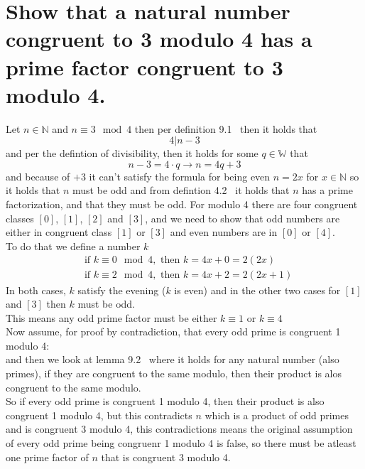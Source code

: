 \documentclass[12pt]{article}
\begin{document}
\section{Show that a natural number congruent to 3 modulo 4 has a prime factor congruent to 3 modulo 4.}
Let $n \in \mathbb{N}$ and $n \equiv 3 \mod 4$ then per definition 9.1~\cite{Algebra} then it holds that
\[
4 | n-3
\]
and per the defintion of divisibility, then it holds for some $q \in \mathbb{W}$ that
\[
n-3 = 4 \cdot q \rightarrow n = 4q + 3
\]
and because of $+3$ it can't satisfy the formula for being even $n = 2x$ for $x \in \mathbb{N}$ so it holds that $n$ must be odd
\newline
and from defintion 4.2~\cite{Algebra} it holds that $n$ has a prime factorization, and that they must be odd. 
\newline
\newline
For modulo 4 there are four congruent classes $[0]$, $[1]$, $[2]$ and $[3]$, and we need to show that odd numbers are either in congruent class $[1]$ or $[3]$ and even numbers are in $[0]$ or $[4]$.\\
To do that we define a number $k$
\begin{align*}
    &\text{if } k \equiv 0 \mod 4, \text{ then }k = 4x + 0 = 2(2x)\\
    &\text{if } k \equiv 2 \mod 4, \text{ then }k = 4x + 2 = 2(2x+1)
\end{align*}
In both cases, $k$ satisfy the evening ($k$ is even) and in the other two cases for $[1]$ and $[3]$ then $k$ must be odd.\\
This means any odd prime factor must be either $k \equiv 1$ or $k \equiv 4$\\
\newline
Now assume, for proof by contradiction, that every odd prime is congruent 1 modulo 4:\\
and then we look at lemma 9.2~\cite{Algebra} where it holds for any natural number (also primes), if they are congruent to the same modulo, then their product is alos congruent to the same modulo.\\
So if every odd prime is congruent 1 modulo 4, then their product is also congruent 1 modulo 4, but this contradicts $n$ which is a product of odd primes and is congruent 3 modulo 4, this contradictions means the original assumption
of every odd prime being congruenr 1 modulo 4 is false, so there must be atleast one prime factor of $n$ that is congruent 3 modulo 4.
\end{document}
